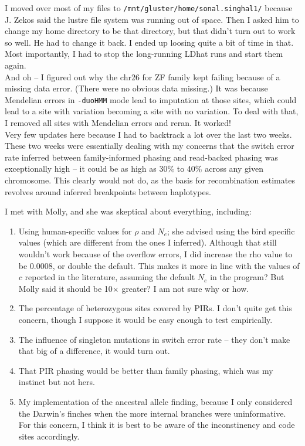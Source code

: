 \documentclass[idxtotoc,hyperref,openany,oneside]{labbook} %
\begin{document}
I moved over most of my files to \verb+/mnt/gluster/home/sonal.singhal1/+ because J. Zekos said the lustre file system was running out of space. Then I asked him to change my home directory to be that directory, but that didn't turn out to work so well. He had to change it back. I ended up loosing quite a bit of time in that. Most importantly, I had to stop the long-running LDhat runs and start them again. \\

And oh -- I figured out why the chr26 for ZF family kept failing because of a missing data error. (There were no obvious data missing.) It was because Mendelian errors in \verb+-duoHMM+ mode lead to imputation at those sites, which could lead to a site with variation becoming a site with no variation. To deal with that, I removed all sites with Mendelian errors and reran. It worked! \\

Very few updates here because I had to backtrack a lot over the last two weeks. These two weeks were essentially dealing with my concerns that the switch error rate inferred between family-informed phasing and read-backed phasing was exceptionally high -- it could be as high as 30\% to 40\% across any given chromosome. This clearly would not do, as the basis for recombination estimates revolves around inferred breakpoints between haplotypes. 

I met with Molly, and she was skeptical about everything, including:
\begin{enumerate}
\item Using human-specific values for $\rho$ and $N_e$; she advised using the bird specific values (which are different from the ones I inferred). Although that still wouldn't work because of the overflow errors, I did increase the rho value to be 0.0008, or double the default. This makes it more in line with the values of $c$ reported in the literature, assuming the default $N_e$ in the program? But Molly said it should be 10$\times$ greater? I am not sure why or how.
\item The percentage of heterozygous sites covered by PIRs. I don't quite get this concern, though I suppose it would be easy enough to test empirically.
\item The influence of singleton mutations in switch error rate -- they don't make that big of a difference, it would turn out.
\item That PIR phasing would be better than family phasing, which was my instinct but not hers.
\item My implementation of the ancestral allele finding, because I only considered the Darwin's finches when the more internal branches were uninformative.  For this concern, I think it is best to be aware of the inconstinency and code sites accordingly. 
\end{enumerate}
\end{document}
